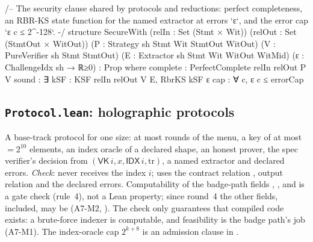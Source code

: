 \begin{leancode}[fontsize=\scriptsize,label={\footnotesize Contract/Security.lean}]
/-- The security clause shared by protocols and reductions: perfect completeness, an RBR-KS
state function for the named extractor at errors `ε`, and the error cap `ε c ≤ 2^-128`. -/
structure SecureWith (relIn : Set (Stmt × Wit)) (relOut : Set (StmtOut × WitOut))
    (P : Strategy sh Stmt Wit StmtOut WitOut) (V : PureVerifier sh Stmt StmtOut)
    (E : Extractor sh Stmt Wit WitOut WitMid) (ε : ChallengeIdx sh → ℝ≥0) : Prop where
  complete : PerfectComplete relIn relOut P V
  sound : ∃ kSF : KSF relIn relOut V E, RbrKS kSF ε
  cap : ∀ c, ε c ≤ errorCap
\end{leancode}

\subsection{\texttt{Protocol.lean}: holographic protocols}

A base-track protocol for one size: at most  rounds of the menu, a key of at most
${}=2^{10}$ elements, an index oracle of a declared shape, an honest prover, the spec
verifier's decision from $(\mathsf{VK}\,i,x,\mathsf{IDX}\,i,\mathrm{tr})$, a named extractor and
declared errors. \emph{Check}:  never receives the index $i$;  uses the
contract relation , output relation  and the declared errors.
Computability of the badge-path fields , ,  and 
is a gate check (rule~4), not a Lean property; since round~4 the other fields,  included, may
be  (A7-M2, ). The check only guarantees that compiled code
exists: a brute-force indexer is computable, and feasibility is the badge path's job (A7-M1). The
index-oracle cap $2^{k+8}$ is an admission clause in .

